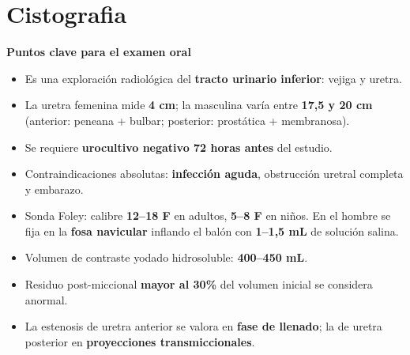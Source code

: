 %

\chapter{Cistografia}



\begin{cajakeypoints}
\textbf{\color{azulprincipal} Puntos clave para el examen oral}
\begin{itemize}[noitemsep, topsep=2pt]
  \item Es una exploración radiológica del \textbf{tracto urinario inferior}: vejiga y uretra.
  \item La uretra femenina mide \textbf{4 cm}; la masculina varía entre \textbf{17,5 y 20 cm} (anterior: peneana + bulbar; posterior: prostática + membranosa).
  \item Se requiere \textbf{urocultivo negativo 72 horas antes} del estudio.
  \item Contraindicaciones absolutas: \textbf{infección aguda}, obstrucción uretral completa y embarazo.
  \item Sonda Foley: calibre \textbf{12--18 F} en adultos, \textbf{5--8 F} en niños. En el hombre se fija en la \textbf{fosa navicular} inflando el balón con \textbf{1--1,5 mL} de solución salina.
  \item Volumen de contraste yodado hidrosoluble: \textbf{400--450 mL}.
  \item Residuo post-miccional \textbf{mayor al 30\%} del volumen inicial se considera anormal.
  \item La estenosis de uretra anterior se valora en \textbf{fase de llenado}; la de uretra posterior en \textbf{proyecciones transmiccionales}.
\end{itemize}
\end{cajakeypoints}

\vspace{1em}

